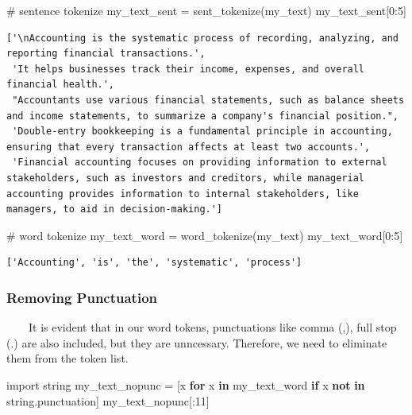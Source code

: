\documentclass[
  letterpaper,
  DIV=11,
  numbers=noendperiod]{scrreprt}
\newenvironment{Shaded}{\begin{snugshade}}{\end{snugshade}}
\newcommand{\CommentTok}[1]{\textcolor[rgb]{0.37,0.37,0.37}{#1}}
\newcommand{\ControlFlowTok}[1]{\textcolor[rgb]{0.00,0.23,0.31}{\textbf{#1}}}
\newcommand{\DecValTok}[1]{\textcolor[rgb]{0.68,0.00,0.00}{#1}}
\newcommand{\ImportTok}[1]{\textcolor[rgb]{0.00,0.46,0.62}{#1}}
\newcommand{\KeywordTok}[1]{\textcolor[rgb]{0.00,0.23,0.31}{\textbf{#1}}}
\newcommand{\NormalTok}[1]{\textcolor[rgb]{0.00,0.23,0.31}{#1}}
\newcommand{\OperatorTok}[1]{\textcolor[rgb]{0.37,0.37,0.37}{#1}}
\begin{document}
\begin{Shaded}
\begin{Highlighting}[]
\CommentTok{\# sentence tokenize}
\NormalTok{my\_text\_sent }\OperatorTok{=}\NormalTok{ sent\_tokenize(my\_text)}
\NormalTok{my\_text\_sent[}\DecValTok{0}\NormalTok{:}\DecValTok{5}\NormalTok{]}
\end{Highlighting}
\end{Shaded}

\begin{verbatim}
['\nAccounting is the systematic process of recording, analyzing, and reporting financial transactions.',
 'It helps businesses track their income, expenses, and overall financial health.',
 "Accountants use various financial statements, such as balance sheets and income statements, to summarize a company's financial position.",
 'Double-entry bookkeeping is a fundamental principle in accounting, ensuring that every transaction affects at least two accounts.',
 'Financial accounting focuses on providing information to external stakeholders, such as investors and creditors, while managerial accounting provides information to internal stakeholders, like managers, to aid in decision-making.']
\end{verbatim}

\begin{Shaded}
\begin{Highlighting}[]
\CommentTok{\# word tokenize}
\NormalTok{my\_text\_word }\OperatorTok{=}\NormalTok{ word\_tokenize(my\_text)}
\NormalTok{my\_text\_word[}\DecValTok{0}\NormalTok{:}\DecValTok{5}\NormalTok{]}
\end{Highlighting}
\end{Shaded}

\begin{verbatim}
['Accounting', 'is', 'the', 'systematic', 'process']
\end{verbatim}

\subsubsection{Removing Punctuation}\label{removing-punctuation}

~~~~It is evident that in our word tokens, punctuations like comma (,),
full stop (.) are also included, but they are unncessary. Therefore, we
need to eliminate them from the token list.

\begin{Shaded}
\begin{Highlighting}[]
\ImportTok{import}\NormalTok{ string}
\NormalTok{my\_text\_nopunc }\OperatorTok{=}\NormalTok{ [x }\ControlFlowTok{for}\NormalTok{ x }\KeywordTok{in}\NormalTok{ my\_text\_word }\ControlFlowTok{if}\NormalTok{ x }\KeywordTok{not} \KeywordTok{in}\NormalTok{ string.punctuation]}
\NormalTok{my\_text\_nopunc[:}\DecValTok{11}\NormalTok{]}
\end{Highlighting}
\end{Shaded}
\end{document}
